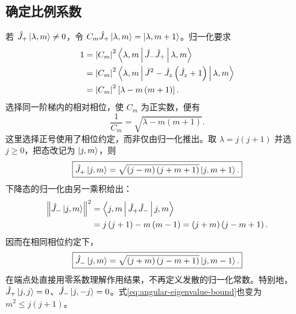 \subsection{确定比例系数}
若 $\hat J_+\Ket{\lambda,m}\neq0$，令
$C_m\hat J_+\Ket{\lambda,m}=\Ket{\lambda,m+1}$。归一化要求
\begin{align}
1&=\left|C_m\right|^2\Braket{\lambda,m|\hat J_-\hat J_+|\lambda,m}\notag\\
&=\left|C_m\right|^2
\Braket{\lambda,m|\hat J^2-\hat J_z\left(\hat J_z+1\right)|\lambda,m}\notag\\
&=\left|C_m\right|^2\left[\lambda-m\left(m+1\right)\right].
\end{align}
选择同一阶梯内的相对相位，使 $C_m$ 为正实数，便有
\begin{equation}
\frac1{C_m}=\sqrt{\lambda-m\left(m+1\right)}.
\end{equation}
这里选择正号使用了相位约定，而非仅由归一化推出。取 $\lambda=j\left(j+1\right)$ 并选 $j\geq0$，把态改记为 $\Ket{j,m}$，则
\begin{equation}
\boxed{\hat J_+\Ket{j,m}=\sqrt{\left(j-m\right)\left(j+m+1\right)}\Ket{j,m+1}.}
\label{eq:angular-raising-action}
\end{equation}
下降态的归一化由另一乘积给出：
\begin{align}
\left\|\hat J_-\Ket{j,m}\right\|^2
&=\Braket{j,m|\hat J_+\hat J_-|j,m}\notag\\
&=j\left(j+1\right)-m\left(m-1\right)
=\left(j+m\right)\left(j-m+1\right).
\end{align}
因而在相同相位约定下，
\begin{equation}
\boxed{\hat J_-\Ket{j,m}=\sqrt{\left(j+m\right)\left(j-m+1\right)}\Ket{j,m-1}.}
\label{eq:angular-lowering-action}
\end{equation}
在端点处直接用零系数理解作用结果，不再定义发散的归一化常数。特别地，$\hat J_+\Ket{j,j}=0$、$\hat J_-\Ket{j,-j}=0$。式\eqref{eq:angular-eigenvalue-bound}也变为 $m^2\leq j\left(j+1\right)$。

